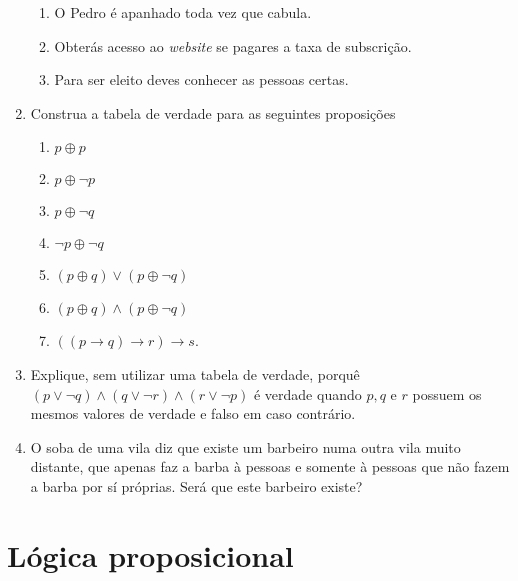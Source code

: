 \begin{enumerate}
\begin{enumerate}
  	  \item O Pedro é apanhado toda vez que cabula.
  	  \item Obterás acesso ao \emph{website} se pagares a taxa de subscrição.
  	  \item Para ser eleito deves conhecer as pessoas certas.
  	\end{enumerate}
  	\item Construa a tabela de verdade para as seguintes proposições
  	\begin{enumerate}
  	  \item $p \oplus p$ \item $p \oplus \lnot p$ \item $p \oplus \lnot q$ \item $\lnot p \oplus \lnot q$
  	  \item $(p \oplus q) \lor (p \oplus \lnot q)$ \item $(p \oplus q) \land (p \oplus \lnot q)$
  	  \item $((p \to q) \to r) \to s$.
	\end{enumerate}
	\item Explique, sem utilizar uma tabela de verdade, porquê $(p \lor \lnot q) \land (q \lor \lnot r) \land (r \lor \lnot p)$ é 
	verdade quando $p, q$ e $r$ possuem os mesmos valores de verdade e falso em caso contrário.
	\item O soba de uma vila diz que existe um barbeiro numa outra vila muito distante, que apenas faz a barba à pessoas
	e somente à pessoas que não fazem a barba por sí próprias. Será que este barbeiro existe?
\end{enumerate}

\section*{Lógica proposicional}


